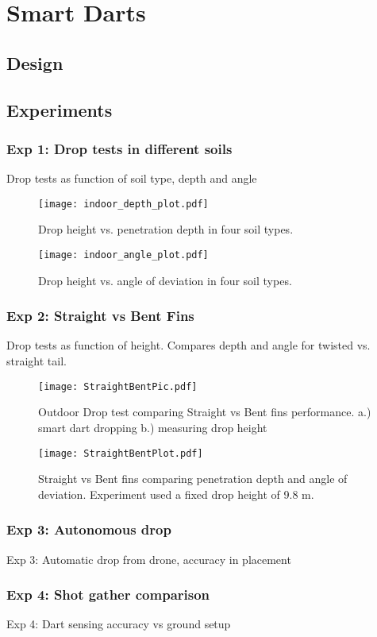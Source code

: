 \section{Smart Darts}\label{sec:SmartDarts}

\subsection{Design}

\subsection{Experiments}
\subsubsection{Exp 1: Drop tests in different soils} 
Drop tests as function of soil type, depth and angle\\
\begin{figure} \centering
{\texttt{[image: indoor\_depth\_plot.pdf]}}
\caption{Drop height vs. penetration depth in four soil types.} 
\label{fig:DepthPlotIndoors}
\vspace{-1em}
\end{figure}
\begin{figure} \centering
{\texttt{[image: indoor\_angle\_plot.pdf]}}
\caption{Drop height vs. angle of deviation in four soil types.} 
\label{fig:AnglePlotIndoors}
\vspace{-1em}
\end{figure}
\subsubsection{Exp 2: Straight vs Bent Fins}
Drop tests as function of height. Compares depth and angle for twisted vs. straight tail.\\
\begin{figure} \centering
  {\texttt{[image: StraightBentPic.pdf]}}
 \caption{Outdoor Drop test comparing Straight vs Bent fins performance.
 a.)  smart dart dropping 
 b.)  measuring drop height} 
 \label{fig:StraightBentPic}
 \vspace{-1em}
\end{figure}
\begin{figure} \centering
  {\texttt{[image: StraightBentPlot.pdf]}}
 \caption{Straight vs Bent fins comparing penetration depth and angle of deviation. Experiment used a fixed drop height of 9.8 m.} 
 \label{fig:StraightBentPlot}
 \vspace{-1em}
\end{figure}

\subsubsection{Exp 3: Autonomous drop}
Exp 3: Automatic drop from drone, accuracy in placement\\
\subsubsection{Exp 4: Shot gather comparison}
Exp 4: Dart sensing accuracy vs ground setup\\
 